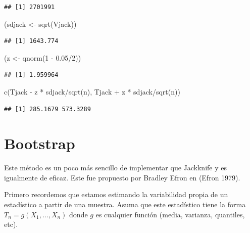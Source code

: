 \documentclass[
  12pt,
]{book}
\newenvironment{Shaded}{\begin{snugshade}}{\end{snugshade}}
\newcommand{\DecValTok}[1]{\textcolor[rgb]{0.00,0.00,0.81}{#1}}
\newcommand{\FloatTok}[1]{\textcolor[rgb]{0.00,0.00,0.81}{#1}}
\newcommand{\FunctionTok}[1]{\textcolor[rgb]{0.00,0.00,0.00}{#1}}
\newcommand{\NormalTok}[1]{#1}
\newcommand{\OtherTok}[1]{\textcolor[rgb]{0.56,0.35,0.01}{#1}}
\newcommand{\SpecialCharTok}[1]{\textcolor[rgb]{0.00,0.00,0.00}{#1}}
\begin{document}
\begin{verbatim}
## [1] 2701991
\end{verbatim}

\begin{Shaded}
\begin{Highlighting}[]
\NormalTok{(sdjack }\OtherTok{\textless{}{-}} \FunctionTok{sqrt}\NormalTok{(Vjack))}
\end{Highlighting}
\end{Shaded}

\begin{verbatim}
## [1] 1643.774
\end{verbatim}

\begin{Shaded}
\begin{Highlighting}[]
\NormalTok{(z }\OtherTok{\textless{}{-}} \FunctionTok{qnorm}\NormalTok{(}\DecValTok{1} \SpecialCharTok{{-}} \FloatTok{0.05}\SpecialCharTok{/}\DecValTok{2}\NormalTok{))}
\end{Highlighting}
\end{Shaded}

\begin{verbatim}
## [1] 1.959964
\end{verbatim}

\begin{Shaded}
\begin{Highlighting}[]
\FunctionTok{c}\NormalTok{(Tjack }\SpecialCharTok{{-}}\NormalTok{ z }\SpecialCharTok{*}\NormalTok{ sdjack}\SpecialCharTok{/}\FunctionTok{sqrt}\NormalTok{(n), Tjack }\SpecialCharTok{+}\NormalTok{ z }\SpecialCharTok{*}\NormalTok{ sdjack}\SpecialCharTok{/}\FunctionTok{sqrt}\NormalTok{(n))}
\end{Highlighting}
\end{Shaded}

\begin{verbatim}
## [1] 285.1679 573.3289
\end{verbatim}

\hypertarget{bootstrap}{%
\section{Bootstrap}\label{bootstrap}}

Este método es un poco más sencillo de implementar que Jackknife y es
igualmente de eficaz. Este fue propuesto por Bradley Efron en (Efron
1979).

Primero recordemos que estamos estimando la variabilidad propia de un
estadístico a partir de una muestra. Asuma que este estadístico tiene la
forma \(T_{n}=g\left( X_{1},\ldots,X_{n} \right)\) donde \(g\) es
cualquier función (media, varianza, quantiles, etc).
\end{document}

